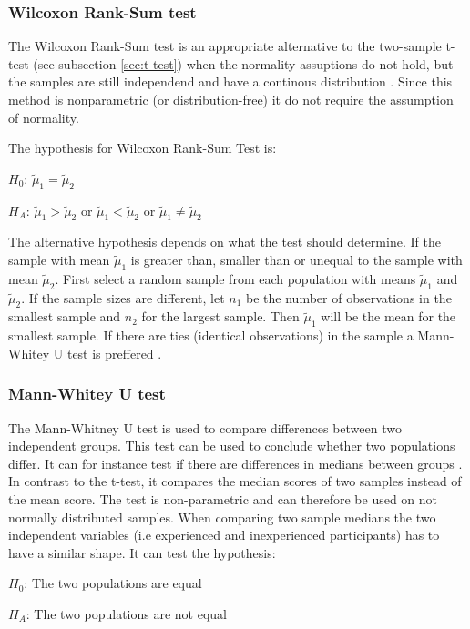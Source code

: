 \subsubsection[Wilcoxon]{Wilcoxon Rank-Sum test}\label{sec:Wilcoxon}
The Wilcoxon Rank-Sum test is an appropriate alternative to the two-sample t-test (see subsection \ref{sec:t-test}) when the normality assuptions do not hold, but the samples are still independend and have a continous distribution \citep{Walpole2012}. Since this method is nonparametric (or distribution-free) it do not require the assumption of normality. 

The hypothesis for Wilcoxon Rank-Sum Test is:\newline

\centerline{$H_{0}$:  $\tilde{\mu}_{1} =  \tilde{\mu}_{2} $} 
\centerline{$H_{A}$: $\tilde{\mu}_{1} >  \tilde{\mu}_{2} $ or $\tilde{\mu}_{1} <  \tilde{\mu}_{2} $ or $\tilde{\mu}_{1} \neq  \tilde{\mu}_{2} $}

The alternative hypothesis depends on what the test should determine. If the sample with mean $\tilde{\mu}_1$ is greater than, smaller than or unequal to the sample with mean $\tilde{\mu}_2$.  First select a random sample from each population with means $\tilde{\mu}_{1} $ and $ \tilde{\mu}_{2} $. If the sample sizes are different, let $n_{1}$ be the number of observations in the smallest sample and $n_{2}$ for the largest sample. Then $\tilde{\mu}_1$ will be the mean for the smallest sample. If there are ties (identical observations) in the sample a Mann-Whitey U test is preffered \citep{TheScipycommunity2017}. 

\subsubsection{Mann-Whitey U test}
The Mann-Whitney U test is used to compare differences between two independent groups. This test can be used to conclude whether two populations differ. It can for instance test if there are differences in medians between groups \citep{LundResearchLtd2013b}. In contrast to the t-test, it compares the median scores of two samples instead of the mean score. The test is non-parametric and can therefore be used on not normally distributed samples. When comparing two sample medians the two independent variables (i.e experienced and inexperienced participants) has to have a similar shape. It can test the hypothesis: \\

\centerline{$H_{0}$: The two populations are equal} 
\centerline{$H_{A}$: The two populations are not equal}

